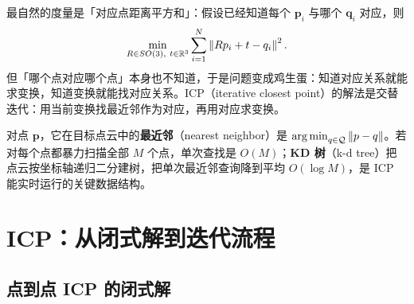 最自然的度量是「对应点距离平方和」：假设已经知道每个 $\bm{p}_i$ 与哪个 $\bm{q}_i$ 对应，则
\begin{equation}
  \min_{\bm{R}\in SO(3),\ \bm{t}\in\mathbb{R}^{3}}
  \sum_{i=1}^{N}\norm{\bm{R}\bm{p}_i+\bm{t}-\bm{q}_i}^{2}.
  \label{eq:07-icp-problem}
\end{equation}
但「哪个点对应哪个点」本身也不知道，于是问题变成鸡生蛋：知道对应关系就能求变换，知道变换就能找对应关系。ICP（iterative closest point）的解法是交替迭代：用当前变换找最近邻作为对应，再用对应求变换。

\begin{definition}[最近邻与 KD 树]
对点 $\bm{p}$，它在目标点云中的\textbf{最近邻}（nearest neighbor）是 $\operatorname*{arg\,min}_{q\in\mathcal{Q}}\left\lVert p-q \right\rVert$。若对每个点都暴力扫描全部 $M$ 个点，单次查找是 $O(M)$；\textbf{KD 树}（k-d tree）把点云按坐标轴递归二分建树，把单次最近邻查询降到平均 $O(\log M)$，是 ICP 能实时运行的关键数据结构。
\end{definition}

\section{ICP：从闭式解到迭代流程}\label{sec:07-icp}

\subsection{点到点 ICP 的闭式解}


